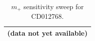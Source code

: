 \begin{table}[t]
\centering
\caption{$m_+$ sensitivity sweep for CD012768.}
\label{tab:m_sensitivity}
\begin{tabular}{l}
\toprule
(data not yet available) \\
\bottomrule
\end{tabular}
\end{table}

